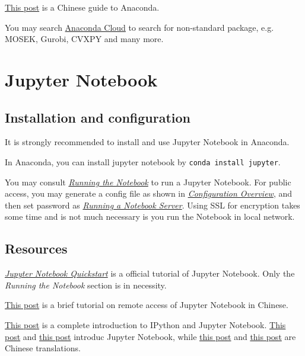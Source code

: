 \documentclass[english]{pkupaper}
\begin{document}
\href{http://www.jianshu.com/p/169403f7e40c}{This post} is a Chinese guide to Anaconda.

You may search \href{https://anaconda.org/}{Anaconda Cloud} to search for non-standard package, e.g. MOSEK, Gurobi, CVXPY and many more.

\section{Jupyter Notebook}

\subsection{Installation and configuration}

It is strongly recommended to install and use Jupyter Notebook in Anaconda.

In Anaconda, you can install jupyter notebook by \verb"conda install jupyter".

You may consult \href{https://jupyter.readthedocs.io/en/latest/running.html}{\emph{Running the Notebook}} to run a Jupyter Notebook. For public access, you may generate a config file as shown in \href{https://jupyter-notebook.readthedocs.io/en/stable/config_overview.html}{\emph{Configuration Overview}}, and then set password as \href{https://jupyter-notebook.readthedocs.io/en/stable/public_server.html}{\emph{Running a Notebook Server}}. Using SSL for encryption takes some time and is not much necessary is you run the Notebook in local network.

\subsection{Resources}

\href{https://jupyter.readthedocs.io/en/latest/content-quickstart.html}{\emph{Jupyter Notebook Quickstart}} is a official tutorial of Jupyter Notebook. Only the \emph{Running the Notebook} section is in necessity.

\href{http://blog.csdn.net/bitboy_star/article/details/51427306}{This post} is a brief tutorial on remote access of Jupyter Notebook in Chinese.

\href{http://blog.csdn.net/mzpmzk/article/details/72310105}{This post} is a complete introduction to IPython and Jupyter Notebook. \href{https://www.packtpub.com/books/content/getting-started-jupyter-notebook-part-1}{This post} and \href{https://www.packtpub.com/books/content/getting-started-jupyter-notebook-part-2}{this post} introduc Jupyter Notebook, while \href{http://blog.csdn.net/red_stone1/article/details/72858962}{this post} and \href{http://blog.csdn.net/red_stone1/article/details/72863749}{this post} are Chinese translations.
\end{document}
